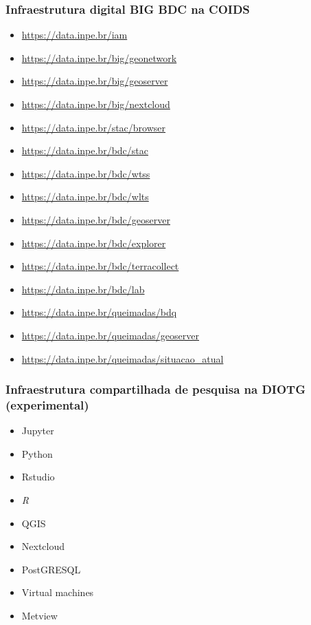 \documentclass[aspectratio=169]{beamer}
\begin{document}
\begin{frame}
        \frametitle{Infraestrutura digital BIG BDC na COIDS}
        \begin{itemize}
            \item \url{https://data.inpe.br/iam}
            \item \url{https://data.inpe.br/big/geonetwork}
            \item \url{https://data.inpe.br/big/geoserver}
            \item \url{https://data.inpe.br/big/nextcloud}
            \item \url{https://data.inpe.br/stac/browser}
            \item \url{https://data.inpe.br/bdc/stac}
            \item \url{https://data.inpe.br/bdc/wtss}
            \item \url{https://data.inpe.br/bdc/wlts}
            \item \url{https://data.inpe.br/bdc/geoserver}
            \item \url{https://data.inpe.br/bdc/explorer}
            \item \url{https://data.inpe.br/bdc/terracollect}
            \item \url{https://data.inpe.br/bdc/lab}
            \item \url{https://data.inpe.br/queimadas/bdq}
            \item \url{https://data.inpe.br/queimadas/geoserver}
            \item \url{https://data.inpe.br/queimadas/situacao_atual}
        \end{itemize}
\end{frame}

\begin{frame}
    \frametitle{Infraestrutura compartilhada de pesquisa na DIOTG (experimental)}
    \begin{itemize}
        \item Jupyter
        \item Python
        \item Rstudio
        \item \textit{R}
        \item QGIS
        \item Nextcloud
        \item PostGRESQL
        \item Virtual machines
        \item Metview
    \end{itemize}
\end{frame}
\end{document}
